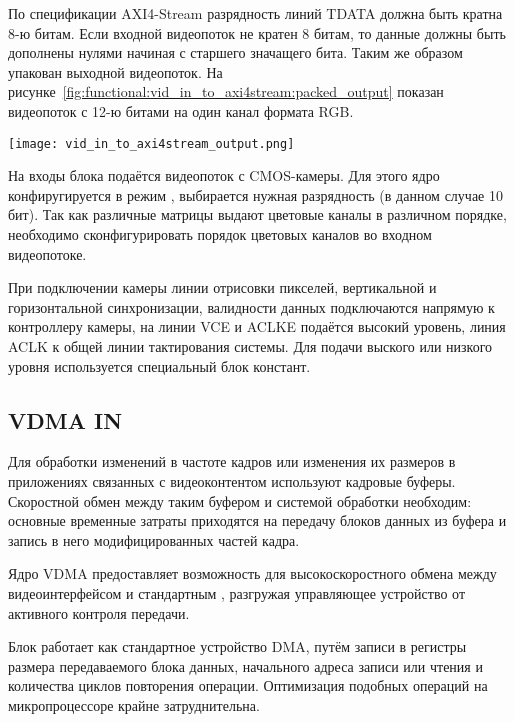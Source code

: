 По спецификации AXI4-Stream разрядность линий TDATA должна быть кратна 8-ю битам. %
Если входной видеопоток не кратен 8 битам, то данные должны быть дополнены нулями
начиная с старшего значащего бита. Таким же образом упакован выходной видеопоток.
На рисунке~\ref{fig:functional:vid_in_to_axi4stream:packed_output} показан
видеопоток с 12-ю битами на один канал формата RGB.

\begin{center}
  \centering
  \texttt{[image: vid\_in\_to\_axi4stream\_output.png]}
  \label{fig:functional:vid_in_to_axi4stream:packed_output}
\end{center}

На входы блока подаётся видеопоток с CMOS-камеры. Для этого ядро конфиругируется в режим
, выбирается нужная разрядность (в данном случае 10 бит). Так как различные
матрицы выдают цветовые каналы в различном порядке, необходимо сконфигурировать порядок цветовых
каналов во входном видеопотоке.

При подключении камеры линии отрисовки пикселей, вертикальной и горизонтальной синхронизации,
валидности данных подключаются напрямую к контроллеру камеры, на линии VCE и ACLKE подаётся высокий уровень,
линия ACLK к общей линии тактирования системы. Для подачи выского или низкого уровня используется
специальный блок констант.


\subsection{VDMA IN}
\label{sec:functional:vdma_in}
Для обработки изменений в частоте кадров или изменения их размеров в приложениях
связанных с видеоконтентом используют кадровые буферы. Скоростной обмен между
таким буфером и системой обработки необходим: основные временные затраты
приходятся на передачу блоков данных из буфера и запись в него модифицированных частей кадра.

Ядро VDMA предоставляет возможность для высокоскоростного обмена между  видеоинтерфейсом
и стандартным , разгружая управляющее устройство от активного контроля передачи.

Блок работает как стандартное устройство DMA, путём записи в регистры размера передаваемого блока данных,
начального адреса записи или чтения и количества циклов повторения операции. Оптимизация подобных
операций на микропроцессоре крайне затруднительна.

